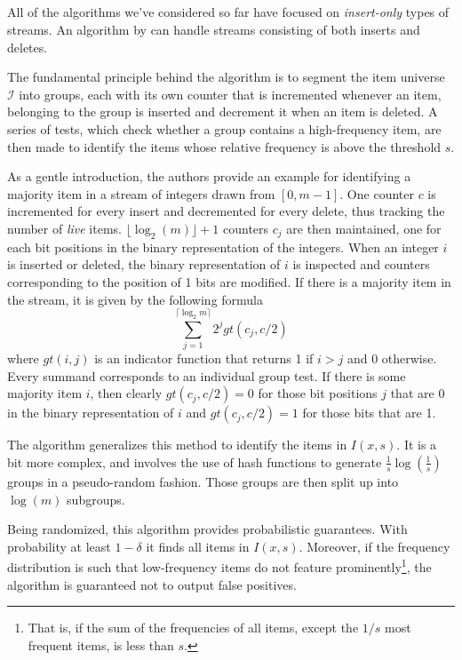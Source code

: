 \documentclass[landscape,twocolumn,a4paper]{article}
\begin{document}
\subsection{\cite{Cormode:2003:WHW:773153.773182}}
All of the algorithms we've considered so far have focused on \textit{insert-only} types of streams. An algorithm by \cite{Cormode:2003:WHW:773153.773182} can handle streams consisting of both inserts and deletes.

The fundamental principle behind the algorithm is to segment the item universe $\mathcal{I}$ into groups, each with its own counter that is incremented whenever an item, belonging to the group is inserted and decrement it when an item is deleted. A series of tests, which check whether a group contains a high-frequency item, are then made to identify the items whose relative frequency is above the threshold $s$.

As a gentle introduction, the authors provide an example for identifying a majority item in a stream of integers drawn from $[0, m-1]$. One counter $c$ is incremented for every insert and decremented for every delete, thus tracking the number of \textit{live} items. $\lfloor \log_2(m) \rfloor + 1$ counters $c_j$ are then maintained, one for each bit positions in the binary representation of the integers. When an integer $i$ is inserted or deleted, the binary representation of $i$ is inspected and counters corresponding to the position of 1 bits are modified. If there is a majority item in the stream, it is given by the following formula
$$
\sum_{j=1}^{\lceil \log_2 m \rceil} 2^j gt(c_j, c/2)
$$
where $gt(i, j)$ is an indicator function that returns 1 if $i > j$ and 0 otherwise. Every summand corresponds to an individual group test. If there is some majority item $i$, then clearly $gt(c_j, c/2) = 0$ for those bit positions $j$ that are 0 in the binary representation of $i$ and $gt(c_j, c/2) = 1$ for those bits that are 1.

The algorithm generalizes this method to identify the items in $I(x, s)$. It is a bit more complex, and involves the use of hash functions to generate $\frac{1}{s}\log (\frac{1}{s})$ groups in a pseudo-random fashion. Those groups are then split up into $\log(m)$ subgroups.

Being randomized, this algorithm provides probabilistic guarantees. With probability at least $1-\delta$ it finds all items in $I(x, s)$. Moreover, if the frequency distribution is such that low-frequency items do not feature prominently\footnote{That is, if the sum of the frequencies of all items, except the $1/s$ most frequent items, is less than $s$.}, the algorithm is guaranteed not to output false positives.
\end{document}
